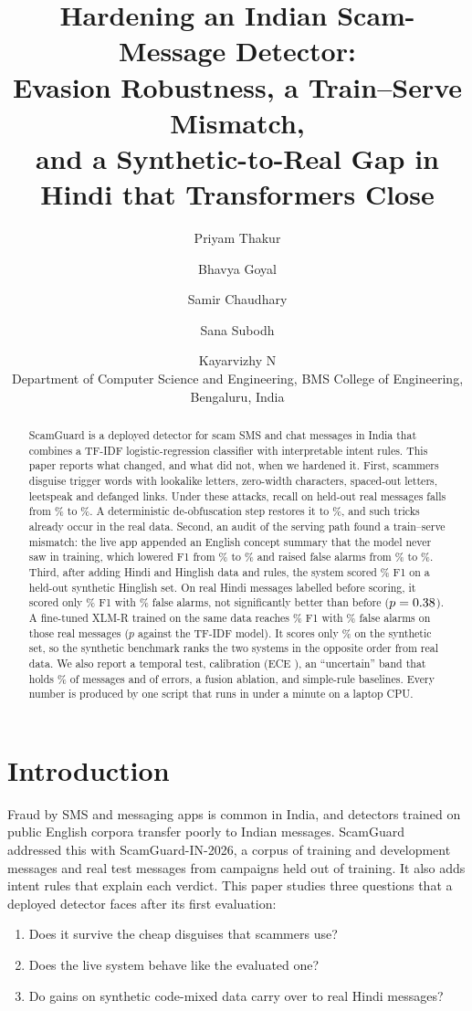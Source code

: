 \documentclass[10pt,twocolumn]{article}
\title{Hardening an Indian Scam-Message Detector:\\Evasion Robustness, a Train--Serve Mismatch,\\and a Synthetic-to-Real Gap in Hindi that Transformers Close}
\author{Priyam Thakur \and Bhavya Goyal \and Samir Chaudhary \and Sana Subodh \and Kayarvizhy N\\[2pt]
\small Department of Computer Science and Engineering, BMS College of Engineering, Bengaluru, India}
\date{}
\begin{document}
\maketitle

\begin{abstract}
ScamGuard is a deployed detector for scam SMS and chat messages in India that combines a TF-IDF logistic-regression
classifier with interpretable intent rules. This paper reports what changed, and what did not, when we hardened it.
First, scammers disguise trigger words with lookalike letters, zero-width characters, spaced-out letters, leetspeak
and defanged links. Under these attacks, recall on \nReal{} held-out real messages falls from \recCleanOne\% to
\recComboOne\%. A deterministic de-obfuscation step restores it to \recComboTwo\%, and such tricks already occur in the
real data. Second, an audit of the serving path found a train--serve mismatch: the live app appended an English concept
summary that the model never saw in training, which lowered F1 from \fRealRep\% to \fRealDep\% and raised false alarms
from \fprRealRep\% to \fprRealDep\%. Third, after adding Hindi and Hinglish data and rules, the system scored
\fHinBTwo\% F1 on a held-out synthetic Hinglish set. On \nRH{} real Hindi messages labelled before scoring, it
scored only \fRHTwo\% F1 with \fprRHTwo\% false alarms, not significantly better than before ($p=0.38$). A fine-tuned
XLM-R trained on the same data reaches \tXlRHF\% F1 with \tXlRHFpr\% false alarms on those real messages ($p$
\tXlRHP{} against the TF-IDF model). It scores only \tXlHinBF\% on the synthetic set, so the synthetic benchmark ranks
the two systems in the opposite order from real data. We also
report a temporal test, calibration (ECE \eceFinal), an ``uncertain'' band that holds \bandShare\% of messages and
\bandErrIn{} of \bandErrTotal{} errors, a fusion ablation, and simple-rule baselines. Every number is produced by one
script that runs in under a minute on a laptop CPU.
\end{abstract}

\section{Introduction}
Fraud by SMS and messaging apps is common in India, and detectors trained on public English corpora transfer poorly
to Indian messages. ScamGuard~\cite{scamguard1} addressed this with ScamGuard-IN-2026, a corpus of \nTrain{}
training and development messages and \nReal{} real test messages from campaigns held out of training. It also adds
intent rules that explain each verdict. This paper studies three questions that a deployed detector faces after its
first evaluation:
\begin{enumerate}\itemsep0pt
\item Does it survive the cheap disguises that scammers use?
\item Does the live system behave like the evaluated one?
\item Do gains on synthetic code-mixed data carry over to real Hindi messages?
\end{enumerate}
\end{document}
